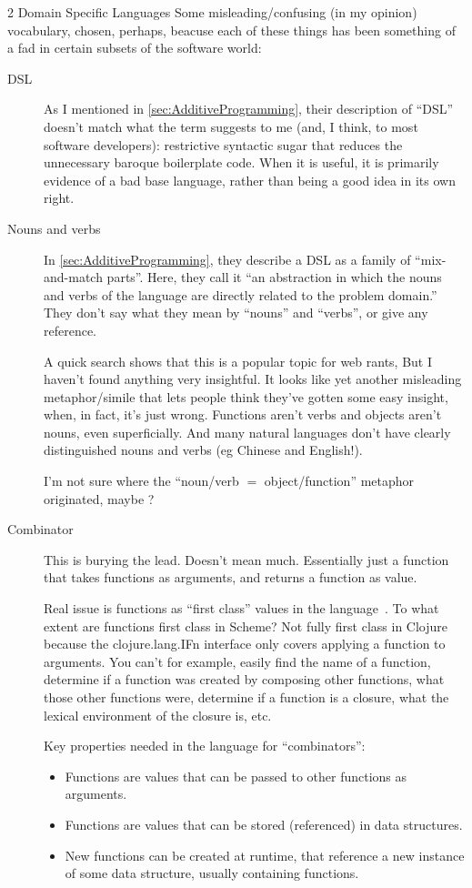 \documentclass[12pt]{PalisadesLakesBook}
\begin{document}
\begin{plSection}{}
\begin{plSection}{2 Domain Specific Languages}
Some misleading/confusing  (in my opinion)
vocabulary, chosen, perhaps, beacuse 
each of these things has been something of a fad
in certain subsets of the software world:
\begin{description}
\item[DSL]
As I mentioned in \cref{sec:AdditiveProgramming},
their description of ``DSL'' doesn't match 
what the term suggests to me
(and, I think, to most software developers):
restrictive syntactic sugar that reduces 
the unnecessary baroque boilerplate code. 
When it is useful, it is primarily evidence 
of a bad base language,
rather than being a good idea in its own right.

\item[Nouns and verbs]
In \cref{sec:AdditiveProgramming},
they describe a DSL as a family
of ``mix-and-match parts''.
Here, they call it  
``an abstraction in which the nouns and verbs of the language
are directly related to the problem domain.''
They don't say what they mean by ``nouns'' and ``verbs'',
or give any reference.

A quick search shows that this is a popular topic for web rants,
But I haven't found anything very insightful.
It looks like yet another misleading metaphor/simile
that lets people think they've gotten some easy insight,
when, in fact, it's just wrong.
Functions aren't verbs and objects aren't nouns,
even superficially.
And many natural languages don't  have clearly distinguished 
nouns and verbs (eg Chinese and English!).

I'm not sure where the ``noun/verb $=$ object/function'' 
metaphor originated,
maybe ?

\item[Combinator]
This is burying the lead. 
Doesn't mean much.
Essentially just a function that takes functions as arguments,
and returns a function as value.

Real issue is functions as ``first class'' values in the 
language~\cite{wiki:FirstClassValue}.
To what extent are functions first class in Scheme?
Not fully first class in Clojure because the 
{\clojureFont clojure.lang.IFn} interface only covers applying 
a function to arguments.
You can't for example, easily find the name of a function,
determine if a function was created 
by composing other functions,
what those other functions were,
determine if a function is a closure,
what the lexical environment of the closure is,
etc.

Key properties needed in the language for ``combinators'':
\begin{itemize}
\item Functions are values that can be passed to other functions
as arguments.
\item Functions are values that can be stored (referenced)
in data structures.
\item New functions can be created at runtime, that reference
a new instance of some data structure,
usually containing functions.
\end{itemize}
\end{description}


\end{plSection}
\end{plSection}
\end{document}
